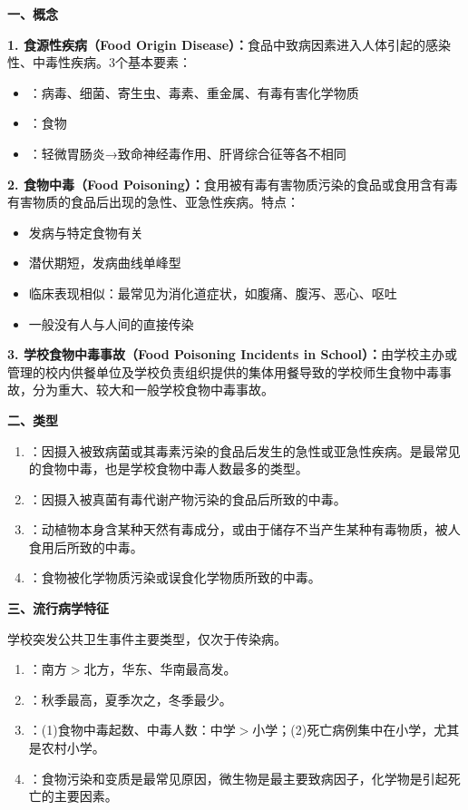 \begin{keybox}
\textbf{一、概念}

\textbf{1. 食源性疾病（Food Origin Disease）：}食品中致病因素进入人体引起的感染性、中毒性疾病。3个基本要素：
\begin{itemize}[leftmargin=*]
    \item {}：病毒、细菌、寄生虫、毒素、重金属、有毒有害化学物质
    \item {}：食物
    \item {}：轻微胃肠炎→致命神经毒作用、肝肾综合征等各不相同
\end{itemize}

\textbf{2. 食物中毒（Food Poisoning）：}食用被有毒有害物质污染的食品或食用含有毒有害物质的食品后出现的急性、亚急性疾病。特点：
\begin{itemize}[leftmargin=*]
    \item 发病与特定食物有关
    \item 潜伏期短，发病曲线单峰型
    \item 临床表现相似：最常见为消化道症状，如腹痛、腹泻、恶心、呕吐
    \item 一般没有人与人间的直接传染
\end{itemize}

\textbf{3. 学校食物中毒事故（Food Poisoning Incidents in School）：}由学校主办或管理的校内供餐单位及学校负责组织提供的集体用餐导致的学校师生食物中毒事故，分为重大、较大和一般学校食物中毒事故。

\textbf{二、类型}

\begin{enumerate}[leftmargin=*]
    \item {}：因摄入被致病菌或其毒素污染的食品后发生的急性或亚急性疾病。是最常见的食物中毒，也是学校食物中毒人数最多的类型。
    \item {}：因摄入被真菌有毒代谢产物污染的食品后所致的中毒。
    \item {}：动植物本身含某种天然有毒成分，或由于储存不当产生某种有毒物质，被人食用后所致的中毒。
    \item {}：食物被化学物质污染或误食化学物质所致的中毒。
\end{enumerate}

\textbf{三、流行病学特征}

学校突发公共卫生事件主要类型，仅次于传染病。

\begin{enumerate}[leftmargin=*]
    \item {}：南方$>$北方，华东、华南最高发。
    \item {}：秋季最高，夏季次之，冬季最少。
    \item {}：(1)食物中毒起数、中毒人数：中学$>$小学；(2)死亡病例集中在小学，尤其是农村小学。
    \item {}：食物污染和变质是最常见原因，微生物是最主要致病因子，化学物是引起死亡的主要因素。
\end{enumerate}


\end{keybox}

